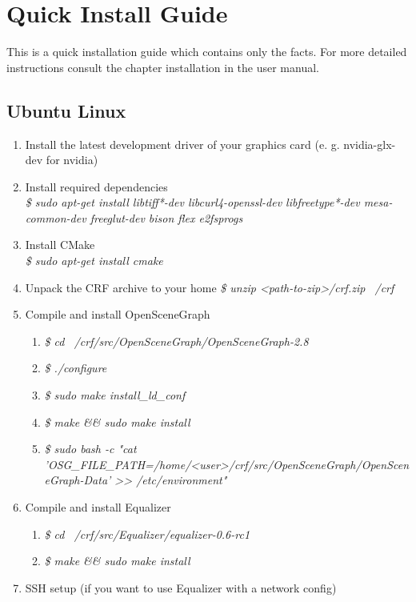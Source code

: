 \chapter{Quick Install Guide}

This is a quick installation guide which contains only the facts. For more detailed instructions consult the chapter installation in the user manual.

\section{Ubuntu Linux}

\begin{enumerate}
	\item Install the latest development driver of your graphics card (e. g. nvidia-glx-dev for nvidia)
	\item Install required dependencies \\ 
		\textit{\$ sudo apt-get install libtiff*-dev libcurl4-openssl-dev libfreetype*-dev mesa-common-dev freeglut-dev bison flex e2fsprogs}
	\item Install CMake \\
		\textit{\$ sudo apt-get install cmake}
	\item Unpack the CRF archive to your home
		\textit{\$ unzip <path-to-zip>/crf.zip ~/crf}
	\item Compile and install OpenSceneGraph
		\begin{enumerate}
			\item \textit{\$ cd ~/crf/src/OpenSceneGraph/OpenSceneGraph-2.8}
			\item \textit{\$ ./configure}
			\item \textit{\$ sudo make install\_ld\_conf}
			\item \textit{\$ make \&\& sudo make install}
			\item \textit{\$ sudo bash -c "cat 'OSG\_FILE\_PATH=/home/<user>/crf/src/OpenSceneGraph/OpenSceneGraph-Data' >> /etc/environment"}
		\end{enumerate}
	\item Compile and install Equalizer
		\begin{enumerate}
                        \item \textit{\$ cd ~/crf/src/Equalizer/equalizer-0.6-rc1}
                        \item \textit{\$ make \&\& sudo make install}
                \end{enumerate}
	\item SSH setup (if you want to use Equalizer with a network config)

\end{enumerate}

